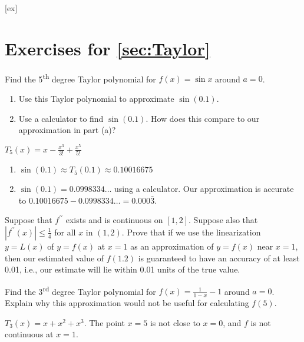 [ex]
\section*{Exercises for \ref{sec:Taylor}}

\begin{enumialphparenastyle}

\begin{ex} 
Find the 5\textsuperscript{th} degree Taylor polynomial for $f(x)=\sin x$ around $a=0$.
\begin{enumerate}
	\item	Use this Taylor polynomial to approximate $\sin (0.1)$.
	\item	Use a calculator to find $\sin (0.1)$. How does this compare to our approximation in part (a)?
\end{enumerate}
\begin{sol}
$T_5(x)=x-\frac{x^3}{3!}+\frac{x^5}{5!}$
\begin{enumerate}
	\item	$\sin (0.1)\approx T_5(0.1)\approx 0.10016675$
	\item	$\sin (0.1)=0.0998334\ldots$ using a calculator. Our approximation is accurate to $0.10016675-0.0998334\ldots =0.000\bar{3}$.
\end{enumerate}
\end{sol}
\end{ex}


\begin{ex}
Suppose that $f^{\prime\prime}$ exists and is continuous on $[1,2]$.
Suppose also that $\left\vert f^{\prime\prime}(x)\right\vert \leq \frac{1}{4}$
for all $x$ in $(1,2)$. Prove that if we use the linearization $y=L(x)$
of $y=f(x)$ at $x=1$ as an approximation of $y=f(x)$ near $x=1$,
then our estimated value of $f(1.2)$ is
guaranteed to have an accuracy of at least 0.01, i.e., our estimate will lie
within 0.01 units of the true value.
\end{ex}


\begin{ex} 
Find the 3\textsuperscript{rd} degree Taylor polynomial for $f(x)=\frac{1}{1-x}-1$ around $a=0$. Explain why this approximation would not be useful for calculating $f(5)$.
\begin{sol}
	$T_3(x)=x+x^2+x^3$. The point $x=5$ is not close to $x=0$, and $f$ is not continuous at $x=1$.
\end{sol}
\end{ex}


\end{enumialphparenastyle}
